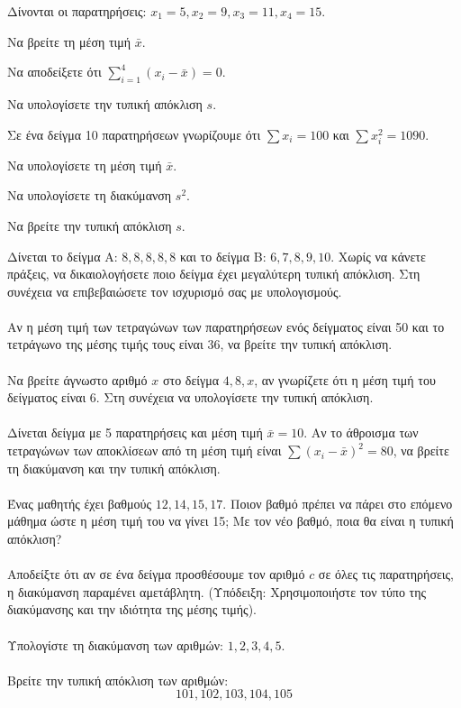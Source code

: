 \documentclass[11pt,a4paper,modern]{FFExercises}
\begin{document}
\askhsh
Δίνονται οι παρατηρήσεις: $x_1=5, x_2=9, x_3=11, x_4=15$.
\begin{alist}
    \item Να βρείτε τη μέση τιμή $\bar{x}$.
    \item Να αποδείξετε ότι $\sum_{i=1}^{4} (x_i - \bar{x}) = 0$.
    \item Να υπολογίσετε την τυπική απόκλιση $s$.
\end{alist}

\askhsh
Σε ένα δείγμα 10 παρατηρήσεων γνωρίζουμε ότι $\sum x_i = 100$ και $\sum x_i^2 = 1090$.
\begin{alist}
    \item Να υπολογίσετε τη μέση τιμή $\bar{x}$.
    \item Να υπολογίσετε τη διακύμανση $s^2$.
    \item Να βρείτε την τυπική απόκλιση $s$.
\end{alist}

\askhsh
Δίνεται το δείγμα Α: $8, 8, 8, 8, 8$ και το δείγμα Β: $6, 7, 8, 9, 10$.
Χωρίς να κάνετε πράξεις, να δικαιολογήσετε ποιο δείγμα έχει μεγαλύτερη τυπική απόκλιση. Στη συνέχεια να επιβεβαιώσετε τον ισχυρισμό σας με υπολογισμούς.\\\\
\askhsh
Αν η μέση τιμή των τετραγώνων των παρατηρήσεων ενός δείγματος είναι 50 και το τετράγωνο της μέσης τιμής τους είναι 36, να βρείτε την τυπική απόκλιση.\\\\
\askhsh
Να βρείτε άγνωστο αριθμό $x$ στο δείγμα $4, 8, x$, αν γνωρίζετε ότι η μέση τιμή του δείγματος είναι 6. Στη συνέχεια να υπολογίσετε την τυπική απόκλιση.\\\\
\askhsh
Δίνεται δείγμα με 5 παρατηρήσεις και μέση τιμή $\bar{x} = 10$. Αν το άθροισμα των τετραγώνων των αποκλίσεων από τη μέση τιμή είναι $\sum (x_i - \bar{x})^2 = 80$, να βρείτε τη διακύμανση και την τυπική απόκλιση.\\\\
\askhsh
Ένας μαθητής έχει βαθμούς $12, 14, 15, 17$. Ποιον βαθμό πρέπει να πάρει στο επόμενο μάθημα ώστε η μέση τιμή του να γίνει 15; Με τον νέο βαθμό, ποια θα είναι η τυπική απόκλιση?\\\\
\askhsh
Αποδείξτε ότι αν σε ένα δείγμα προσθέσουμε τον αριθμό $c$ σε όλες τις παρατηρήσεις, η διακύμανση παραμένει αμετάβλητη. (Υπόδειξη: Χρησιμοποιήστε τον τύπο της διακύμανσης και την ιδιότητα της μέσης τιμής).\\\\
\askhsh
Υπολογίστε τη διακύμανση των αριθμών: $1, 2, 3, 4, 5$.\\\\
\askhsh
Βρείτε την τυπική απόκλιση των αριθμών: 
\[101, 102, 103, 104, 105\]
\end{document}

